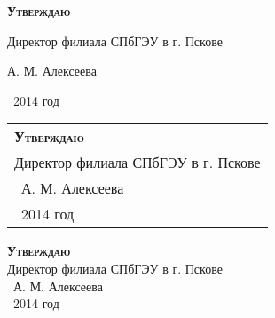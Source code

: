 \documentclass[
	12pt,
	a4paper,
	]
	{article}
\begin{document}
\newlength{\pblength}\settowidth{\pblength}{Директор филиала СПбГЭУ в г. Пскове}


\hfill\parbox{\pblength}{
	\textbf{\textsc{Утверждаю}}\medskip

	Директор филиала СПбГЭУ в г. Пскове\medskip

	\makebox[3cm]{\hrulefill} А. М. Алексеева\medskip

	\makebox[1.5cm]{<<\hrulefill>>} \makebox[3cm]{\hrulefill}\ 2014 год
}

\bigskip \bigskip


{\extrarowheight=2mm
\hfill\begin{tabular}{l@{}}
	\textbf{\textsc{Утверждаю}} \\
	Директор филиала СПбГЭУ в г. Пскове \\
	\hrulefill\ А. М. Алексеева \\
	\makebox[1.5cm]{<<\hrulefill>>} \hrulefill\ 2014 год
\end{tabular}}

\bigskip \bigskip

\begin{flushright}
	\textbf{\textsc{Утверждаю}}\\[2mm]
	Директор филиала СПбГЭУ в г. Пскове \\[2mm]
	\makebox[3cm]{\hrulefill}\ А. М. Алексеева \\[2mm]
	\makebox[1.5cm]{<<\hrulefill>>} \makebox[3cm]{\hrulefill}\ 2014 год
\end{flushright}


\newlength{\boo}\settowidth{\boo}{boo}
\end{document}
